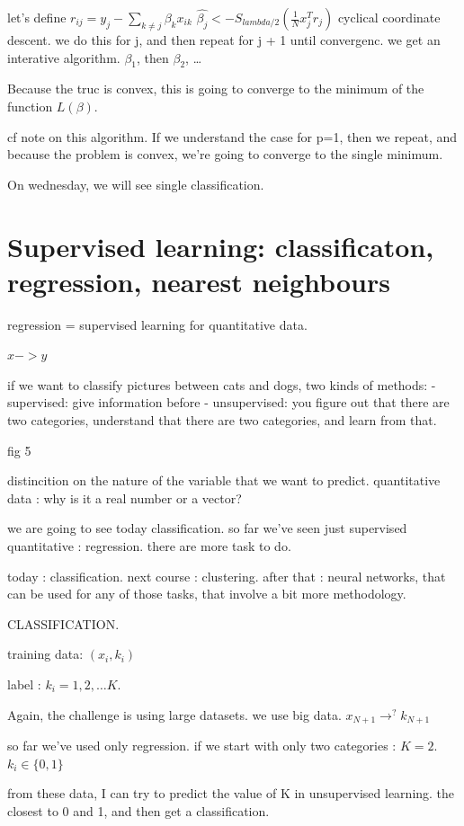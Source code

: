 \documentclass[a4paper]{tufte-book}
\begin{document}
let's define $r_{ij} = y_j - \sum_{k\neq j} \beta_k x_{ik}$
$\hat{\beta_j} <- S_{lambda/2} (\frac{1}{N} x_j^T r_j)$
cyclical coordinate descent. we do this for j, and then repeat for j + 1 until
convergenc.
we get an interative algorithm. $\beta_1$, then $\beta_2$, \ldots

Because the truc is convex, this is going to converge to the minimum of the function $L(\beta)$.

cf note on this algorithm. If we understand the case for p=1, then we repeat,
and because the problem is convex, we're going to converge to the single minimum.

On wednesday, we will see single classification.

\chapter{Supervised learning: classificaton, regression, nearest neighbours}
\label{ch:supervised-learning}

regression = supervised learning for quantitative data.

$x->y$

if we want to classify pictures between cats and dogs, two kinds of methods:
- supervised: give information before
- unsupervised: you figure out that there are two categories, understand that
there are two categories, and learn from that.

fig 5

distincition on the nature of the variable that we want to predict.
quantitative data : why is it a real number or a vector?

we are going to see today classification. so far we've seen just supervised
quantitative : regression. there are more task to do.

today : classification.
next course : clustering.
after that : neural networks, that can be used for any of those tasks, that
involve a bit more methodology.

CLASSIFICATION. 

training data: $(x_i,k_i)$

label : $k_i = 1, 2, \ldots K$.



Again, the challenge is using large datasets. we use big data.
$x_{N+1} \rightarrow^? k_{N+1}$

so far we've used only regression.
if we start with only two categories : $K=2$.
$k_i \in \{ 0, 1 \}$

from these data, I can try to predict the value of K in unsupervised learning.
the closest to 0 and 1, and then get a classification.
\end{document}
